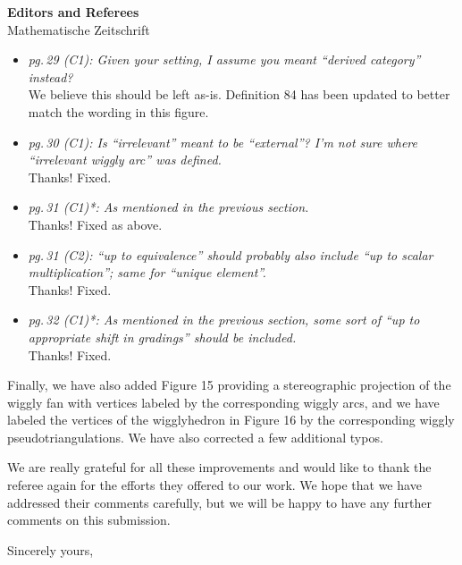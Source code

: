 \documentclass{letter}
\begin{document}
\begin{letter}{{\bf Editors and Referees} \\ Mathematische Zeitschrift}
\begin{itemize}
\item \textsl{\color{gray} pg.\,29 (C1): Given your setting, I assume you meant ``derived category'' instead?} \\
We believe this should be left as-is. Definition 84 has been updated to better match the wording in this figure.

\item \textsl{\color{gray} pg.\,30 (C1): Is ``irrelevant'' meant to be ``external''? I’m not sure where ``irrelevant wiggly arc'' was defined.} \\
Thanks! Fixed.

\item \textsl{\color{gray} pg.\,31 (C1)*: As mentioned in the previous section.} \\
Thanks! Fixed as above.

\item \textsl{\color{gray} pg.\,31 (C2): ``up to equivalence'' should probably also include ``up to scalar multiplication''; same for ``unique element''.} \\
Thanks! Fixed.

\item \textsl{\color{gray} pg.\,32 (C1)*: As mentioned in the previous section, some sort of ``up to appropriate shift in gradings'' should be included.} \\
Thanks! Fixed.

\end{itemize}

Finally, we have also added Figure 15 providing a stereographic projection of the wiggly fan with vertices labeled by the corresponding wiggly arcs, and we have labeled the vertices of the wigglyhedron in Figure 16 by the corresponding wiggly pseudotriangulations.
We have also corrected a few additional typos.

We are really grateful for all these improvements and would like to thank the referee again for the efforts they offered to our work. We hope that we have addressed their comments carefully, but we will be happy to have any further comments on this submission.

%

\closing{Sincerely yours,}

\end{letter}
\end{document}
